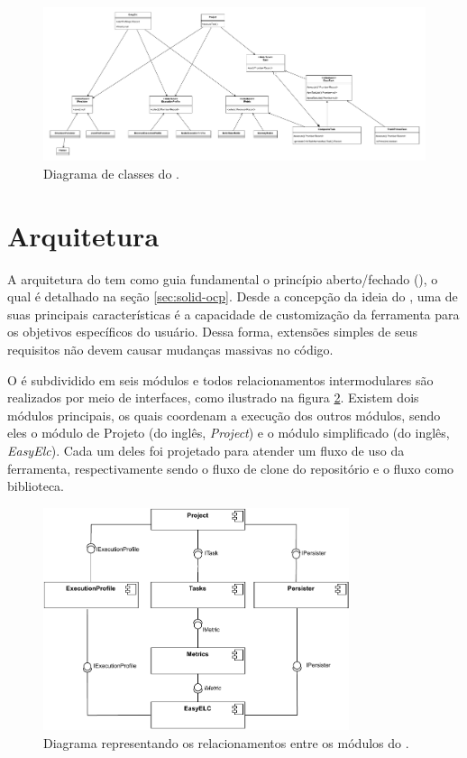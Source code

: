 \documentclass[12pt]{tcc}
\begin{document}
	\begin{figure}[!ht]
		\centering
		\includegraphics[width=\textwidth]{figures/diagrama-classes.pdf}
		\caption{Diagrama de classes do .}
		\label{fig:diag-classes}
	\end{figure}


	\section{Arquitetura}
	\label{sec:arquitetura}

	A arquitetura do  tem como guia fundamental o princípio aberto/fechado (), o qual é detalhado na seção \ref{sec:solid-ocp}.
	Desde a concepção da ideia do , uma de suas principais características é a capacidade de customização da ferramenta para os objetivos específicos do usuário.
	Dessa forma, extensões simples de seus requisitos não devem causar mudanças massivas no código.

	O  é subdividido em seis módulos e todos relacionamentos intermodulares são realizados por meio de interfaces, como ilustrado na figura \ref{fig:diagrama-arquitetura}.
	Existem dois módulos principais, os quais coordenam a execução dos outros módulos, sendo eles o módulo de Projeto (do inglês, \emph{Project}) e o módulo  simplificado (do inglês, \emph{EasyElc}).
	Cada um deles foi projetado para atender um fluxo de uso da ferramenta, respectivamente sendo o fluxo de clone do repositório e o fluxo como biblioteca.

	\begin{figure}[!ht]
		\centering
		\includegraphics[width=0.8\textwidth]{figures/diagramaarquiteturaelchupacabra.pdf}
		\caption{Diagrama representando os relacionamentos entre os módulos do .}
		\label{fig:diagrama-arquitetura}
	\end{figure}
	
\end{document}
